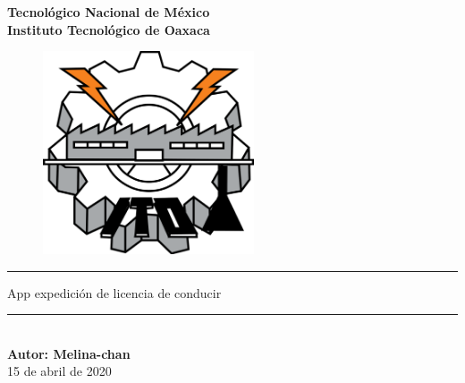 \begin{titlepage}
	\begin{center}
		{\huge \textbf{Tecnológico Nacional de México}}\\
		\vspace{3mm}
		{\LARGE \textbf{Instituto Tecnológico de Oaxaca}}
		\vspace{5mm}
		\begin{figure}[h]
			\centering
			\includegraphics[height=6cm]{img/logo_ito.png}
		\end{figure}
	
	\textcolor{azul}{\rule{\linewidth}{0.75mm}}
	
	\begin{spacing}{1.5}
		{\LARGE App expedición de licencia de conducir}
	\end{spacing}
	
	\textcolor{azul}{\rule{\linewidth}{0.75mm}}
	\\
	\textbf{Autor: Melina-chan}
	\\
	15 de abril de 2020
	\vspace{15mm}
	\end{center}
	
	

\end{titlepage}